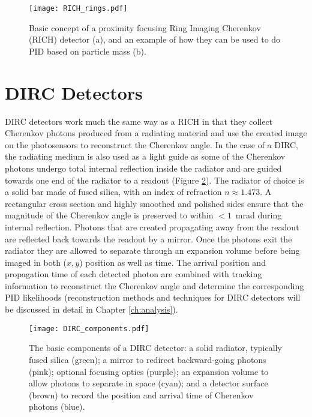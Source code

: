 \begin{figure}[!htb]
	\centering
	\texttt{[image: RICH\_rings.pdf]}
	\caption{Basic concept of a proximity focusing Ring Imaging Cherenkov (RICH) detector (a), and an example of how they can be used to do PID based on particle mass (b).}
	\label{fig:rich_basics}
\end{figure}


\section{DIRC Detectors}
DIRC detectors work much the same way as a RICH in that they collect Cherenkov photons produced from a radiating material and use the created image on the photosensors to reconstruct the Cherenkov angle. In the case of a DIRC, the radiating medium is also used as a light guide as some of the Cherenkov photons undergo total internal reflection inside the radiator and are guided towards one end of the radiator to a readout (Figure \ref{fig:dircbasics}). The radiator of choice is a solid bar made of fused silica, with an index of refraction $n \approx 1.473$. A rectangular cross section and highly smoothed and polished sides ensure that the magnitude of the Cherenkov angle is preserved to within $<1$~mrad during internal reflection. Photons that are created propagating away from the readout are reflected back towards the readout by a mirror. Once the photons exit the radiator they are allowed to separate through an expansion volume before being imaged in both ($x, y$) position as well as time. The arrival position and propagation time of each detected photon are combined with tracking information to reconstruct the Cherenkov angle and determine the corresponding PID likelihoods (reconstruction methods and techniques for DIRC detectors will be discussed in detail in Chapter \ref{ch:analysis}).

\begin{figure}[!htb]
	\centering
	\texttt{[image: DIRC\_components.pdf]}
	\caption{The basic components of a DIRC detector: a solid radiator, typically fused silica (green); a mirror to redirect backward-going photons (pink); optional focusing optics (purple); an expansion volume to allow photons to separate in space (cyan); and a detector surface (brown) to record the position and arrival time of Cherenkov photons (blue).}
	\label{fig:dircbasics}
\end{figure}

